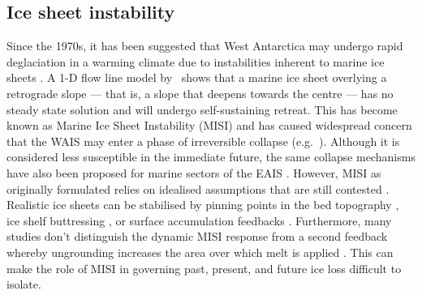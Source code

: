 
\subsection{Ice sheet instability}\label{section:ice-sheet-instability}

Since the 1970s, it has been suggested that West Antarctica may undergo rapid deglaciation in a warming climate due to instabilities inherent to marine ice sheets \citep{weertmanStabilityJunctionIce1974,mercerWestAntarcticIce1978}. A 1-D flow line model by~\cite{schoofIceSheetGrounding2007} shows that a marine ice sheet overlying a retrograde slope --- that is, a slope that deepens towards the centre --- has no steady state solution and will undergo self-sustaining retreat. This has become known as Marine Ice Sheet Instability (MISI) and has caused widespread concern that the WAIS may enter a phase of irreversible collapse (e.g.~\citealt{armstrongmckayExceeding15degCGlobal2022}). Although it is considered less susceptible in the immediate future, the same collapse mechanisms have also been proposed for marine sectors of the EAIS \citep{stokesResponseEastAntarctic2022}. However, MISI as originally formulated relies on idealised assumptions that are still contested \citep{sergienkoBedTopographyMarine2022,sergienkoStableUnstableAre2023}. Realistic ice sheets can be stabilised by pinning points in the bed topography \citep{favierThreedimensionalFullStokes2012,favierDynamicInfluencePinning2016}, ice shelf buttressing \citep{peglerMarineIceSheet2018,cornfordResultsThirdMarine2020}, or surface accumulation feedbacks \citep{sergienkoNoGeneralStability2022}. Furthermore, many studies don't distinguish the dynamic MISI response from a second feedback whereby ungrounding increases the area over which melt is applied \citep{arthernSensitivityWestAntarctica2017}. This can make the role of MISI in governing past, present, and future ice loss difficult to isolate.

